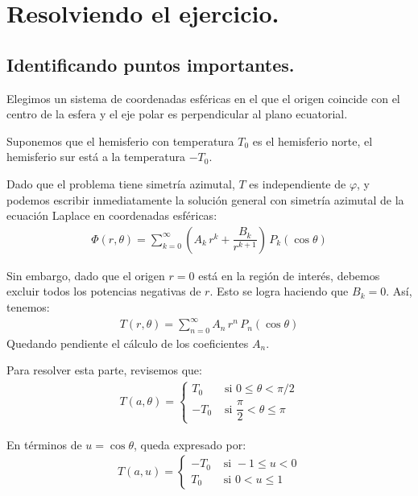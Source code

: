 \section{Resolviendo el ejercicio.}
\subsection{Identificando puntos importantes.}

Elegimos un sistema de coordenadas esféricas en el que el origen coincide con el centro de la esfera y el eje polar es perpendicular al plano ecuatorial.
\par
Suponemos que el hemisferio con temperatura $T_{0}$ es el hemisferio norte, el hemisferio sur está a la temperatura $-T_{0}$.
\par
Dado que el problema tiene simetría azimutal, $T$ es independiente de $\varphi$, y podemos escribir inmediatamente la solución general con simetría azimutal de la ecuación Laplace en coordenadas esféricas:
\begin{align*}
\Phi (r, \theta) = \sum_{k=0}^{\infty} \left( A_{k} \, r^{k} + \dfrac{B_{k}}{r^{k+1}} \right) \, P_{k} (\cos \theta)
\end{align*}

Sin embargo, dado que el origen $r = 0$ está en la región de interés, debemos excluir todos los potencias negativas de $r$.  Esto se logra haciendo que $B_{k} = 0$. Así, tenemos:
\begin{align}
T(r, \theta) = \sum_{n=0}^{\infty} A_{n} \, r^{n} \, P_{n} (\cos \theta)
\label{eq:ecuacion_26_50}
\end{align}
Quedando pendiente el cálculo de los coeficientes $A_{n}$.

Para resolver esta parte, revisemos que:
\begin{align*}
T (a, \theta) = \begin{cases}
T_{0} & \mbox{ si } 0 \leq \theta < \pi / 2 \\[1em]
-T_{0} & \mbox{ si } \dfrac{\pi}{2} < \theta \leq \pi
\end{cases}
\end{align*}

En términos de $u = \cos \theta$, queda expresado por:
\begin{align*}
T (a, u) = \begin{cases}
-T_{0} & \mbox{ si } -1 \leq u < 0 \\[1em]
T_{0} & \mbox{ si } 0 < u \leq 1
\end{cases}
\end{align*}

